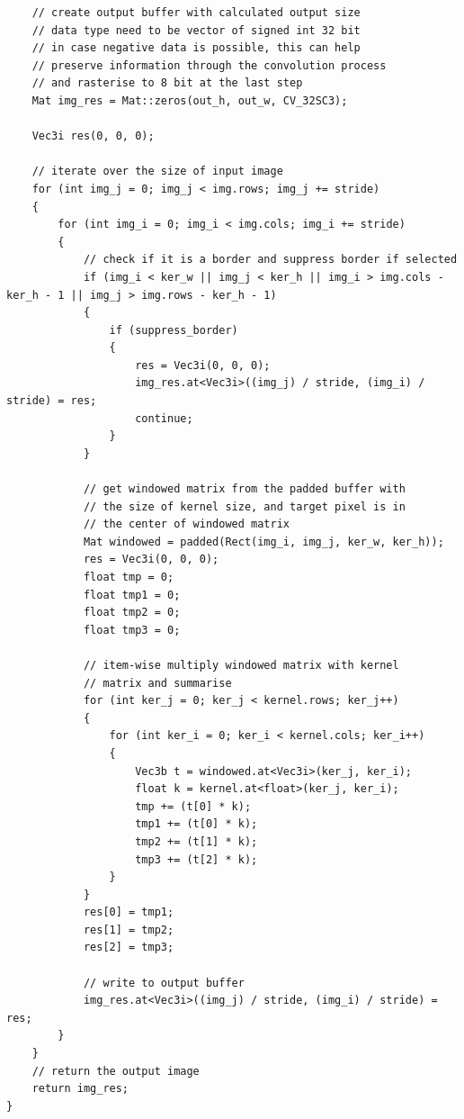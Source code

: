 \documentclass[12pt,a4paper]{report}
\begin{document}
\begin{lstlisting}
    // create output buffer with calculated output size
    // data type need to be vector of signed int 32 bit
    // in case negative data is possible, this can help
    // preserve information through the convolution process
    // and rasterise to 8 bit at the last step
    Mat img_res = Mat::zeros(out_h, out_w, CV_32SC3);

    Vec3i res(0, 0, 0);

    // iterate over the size of input image
    for (int img_j = 0; img_j < img.rows; img_j += stride)
    {
        for (int img_i = 0; img_i < img.cols; img_i += stride)
        {
            // check if it is a border and suppress border if selected
            if (img_i < ker_w || img_j < ker_h || img_i > img.cols - ker_h - 1 || img_j > img.rows - ker_h - 1)
            {
                if (suppress_border)
                {
                    res = Vec3i(0, 0, 0);
                    img_res.at<Vec3i>((img_j) / stride, (img_i) / stride) = res;
                    continue;
                }
            }

            // get windowed matrix from the padded buffer with
            // the size of kernel size, and target pixel is in
            // the center of windowed matrix
            Mat windowed = padded(Rect(img_i, img_j, ker_w, ker_h));
            res = Vec3i(0, 0, 0);
            float tmp = 0;
            float tmp1 = 0;
            float tmp2 = 0;
            float tmp3 = 0;

            // item-wise multiply windowed matrix with kernel
            // matrix and summarise
            for (int ker_j = 0; ker_j < kernel.rows; ker_j++)
            {
                for (int ker_i = 0; ker_i < kernel.cols; ker_i++)
                {
                    Vec3b t = windowed.at<Vec3i>(ker_j, ker_i);
                    float k = kernel.at<float>(ker_j, ker_i);
                    tmp += (t[0] * k);
                    tmp1 += (t[0] * k);
                    tmp2 += (t[1] * k);
                    tmp3 += (t[2] * k);
                }
            }
            res[0] = tmp1;
            res[1] = tmp2;
            res[2] = tmp3;

            // write to output buffer
            img_res.at<Vec3i>((img_j) / stride, (img_i) / stride) = res;
        }
    }
    // return the output image
    return img_res;
}
\end{lstlisting}
\end{document}
